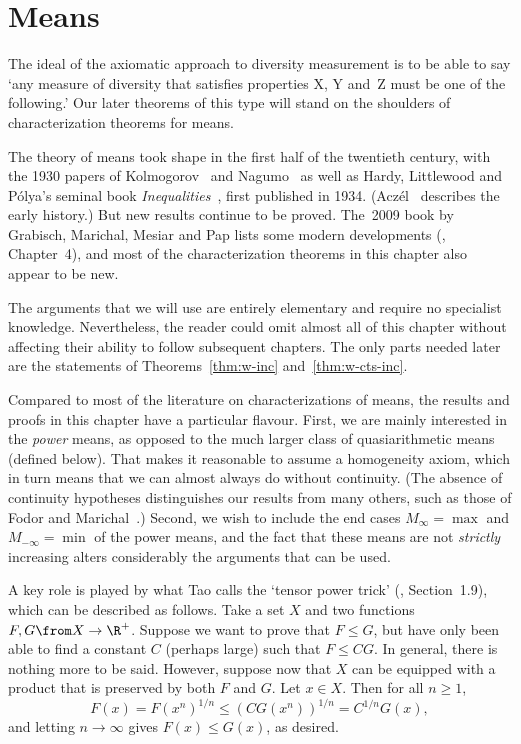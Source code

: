 \chapter{Means}

The ideal of the axiomatic approach to diversity measurement is to be able
to say `any measure of diversity that satisfies properties X, Y and~Z must
be one of the following.'  Our later theorems of this type will
stand on the shoulders of characterization theorems for means.

The theory of means took shape in the first half of the twentieth century,
with the 1930 papers of Kolmogorov~\cite{KolmSNM,KolmONM}%
%
% 
and Nagumo~\cite{Nagu}%
%
% 
as well as Hardy,%
%
%
Littlewood%
%
%
and P\'olya's%
%
% 
seminal book \emph{Inequalities}~\cite{HLP}, first published in 1934.
(Acz\'el~\cite{AczeMV} describes the early history.)  But new results
continue to be proved.  The~2009 book by Grabisch, Marichal, Mesiar and Pap
lists some modern developments (\cite{GMMP}, Chapter~4), and most of the
characterization theorems in this chapter also appear to be new.

The arguments that we will use are entirely elementary and require no
specialist knowledge.  Nevertheless, the reader could omit almost all of
this chapter without affecting their ability to follow subsequent chapters.
The only parts needed later are the statements of Theorems~\ref{thm:w-inc}
and~\ref{thm:w-cts-inc}.

Compared to most of the literature on characterizations of means, the
results and proofs in this chapter have a particular flavour.  First, we
are mainly interested in the \emph{power} means, as opposed to the much
larger class of quasiarithmetic means (defined below).  That makes it
reasonable to assume a homogeneity axiom, which in turn means that we can
almost always do without continuity.  (The absence of continuity hypotheses
distinguishes our results from many others, such as those of Fodor and
Marichal~\cite{FoMa}.)  Second, we wish to include the end cases $M_\infty
= \max$ and $M_{-\infty} = \min$ of the power means, and the fact that
these means are not \emph{strictly} increasing alters considerably the
arguments that can be used.

A key role is played by what Tao%
%
%
calls the `tensor%
%
% 
power trick' (\cite{TaoSR}, Section~1.9), which can be described as
follows.  Take a set $X$ and two functions $F, G \from X \to \R^+$.
Suppose we want to prove that $F \leq G$, but have only been able to find a
constant $C$ (perhaps large) such that $F \leq C G$.  In general, there is
nothing more to be said.  However, suppose now that $X$ can be equipped
with a product that is preserved by both $F$ and $G$.  Let $x \in X$.  Then
for all $n \geq 1$,
\[
F(x) = F(x^n)^{1/n} \leq (C G(x^n))^{1/n} = C^{1/n} G(x),
\]
and letting $n \to \infty$ gives $F(x) \leq G(x)$, as desired. 


